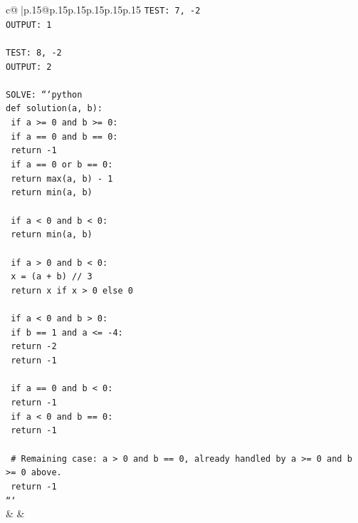\documentclass{article}
\begin{document}
{\begin{supertabular}{c@{$\;$}|p{.15\linewidth}@{}p{.15\linewidth}p{.15\linewidth}p{.15\linewidth}p{.15\linewidth}p{.15\linewidth}}
{{{\texttt{TEST: 7, {-}2} \\
\texttt{OUTPUT: 1} \\
\\ 
\texttt{TEST: 8, {-}2} \\
\texttt{OUTPUT: 2} \\
\\ 
\texttt{SOLVE: ```python} \\
\texttt{def solution(a, b):} \\
\texttt{    if a >= 0 and b >= 0:} \\
\texttt{        if a == 0 and b == 0:} \\
\texttt{            return {-}1} \\
\texttt{        if a == 0 or b == 0:} \\
\texttt{            return max(a, b) {-} 1} \\
\texttt{        return min(a, b)} \\
\\ 
\texttt{    if a < 0 and b < 0:} \\
\texttt{        return min(a, b)} \\
\\ 
\texttt{    if a > 0 and b < 0:} \\
\texttt{        x = (a + b) // 3} \\
\texttt{        return x if x > 0 else 0} \\
\\ 
\texttt{    if a < 0 and b > 0:} \\
\texttt{        if b == 1 and a <= {-}4:} \\
\texttt{            return {-}2} \\
\texttt{        return {-}1} \\
\\ 
\texttt{    if a == 0 and b < 0:} \\
\texttt{        return {-}1} \\
\texttt{    if a < 0 and b == 0:} \\
\texttt{        return {-}1} \\
\\ 
\texttt{    \# Remaining case: a > 0 and b == 0, already handled by a >= 0 and b >= 0 above.} \\
\texttt{    return {-}1} \\
\texttt{```} \\
            }
        }
    }
    & & \\ \\


\end{supertabular}}
\end{document}

